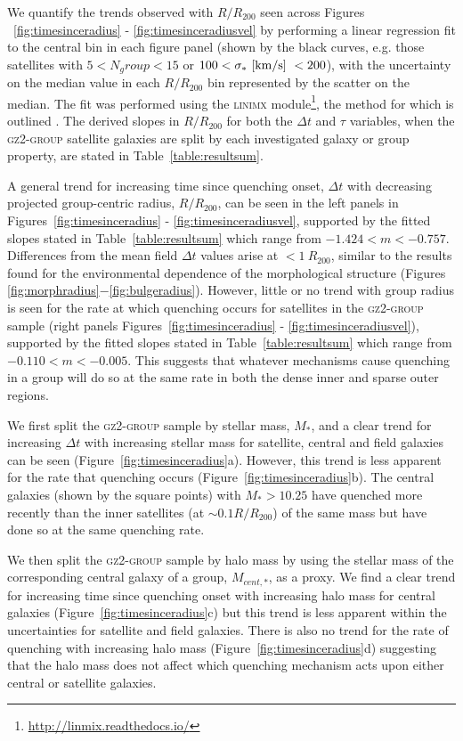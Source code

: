 \documentclass[useAMS,usenatbib]{mn2e}
\begin{document}
We quantify the trends observed with $R/R_{200}$ seen across Figures ~\ref{fig:timesinceradius} - \ref{fig:timesinceradiusvel} by performing a linear regression fit to the central bin in each figure panel (shown by the black curves, e.g. those satellites with $5 < N_group < 15$ or $100 < \sigma_*~\rm{[km/s]}~< 200$), with the uncertainty on the median value in each $R/R_{200}$ bin represented by the scatter on the median. The fit was performed using the \textsc{linimx} module\footnote{\url{http://linmix.readthedocs.io/}}, the method for which is outlined \citealt{kelly07}. The derived slopes in $R/R_{200}$ for both the $\Delta t$ and $\tau$ variables, when the \textsc{gz2-group} satellite galaxies are split by each investigated galaxy or group property, are stated in Table~\ref{table:resultsum}.

A general trend for increasing time since quenching onset, $\Delta t$ with decreasing projected group-centric radius, $R/R_{200}$, can be seen in the left panels in Figures~\ref{fig:timesinceradius} - \ref{fig:timesinceradiusvel}, supported by the fitted slopes stated in Table~\ref{table:resultsum} which range from $-1.424 < m < -0.757$. Differences from the mean field $\Delta t$ values arise at $<1~R_{200}$, similar to the results found for the environmental dependence of the morphological structure (Figures \ref{fig:morphradius}$-$\ref{fig:bulgeradius}). However, little or no trend with group radius is seen for the rate at which quenching occurs for satellites in the \textsc{gz2-group} sample (right panels Figures~\ref{fig:timesinceradius} - \ref{fig:timesinceradiusvel}), supported by the fitted slopes stated in Table~\ref{table:resultsum} which range from $-0.110 < m < -0.005$. This suggests that whatever mechanisms cause quenching in a group will do so at the same rate in both the dense inner and sparse outer regions. 

We first split the \textsc{gz2-group} sample by stellar mass, $M_*$, and a clear trend for increasing $\Delta t$ with increasing stellar mass for satellite, central and field galaxies can be seen (Figure~\ref{fig:timesinceradius}a). However, this trend is less apparent for the rate that quenching occurs (Figure~\ref{fig:timesinceradius}b). The central galaxies (shown by the square points) with $M_* > 10.25$ have quenched more recently than the inner satellites (at $\sim0.1R/R_{200}$) of the same mass but have done so at the same quenching rate. 

We then split the \textsc{gz2-group} sample by halo mass by using the stellar mass of the corresponding central galaxy of a group, $M_{cent,*}$, as a proxy. We find a clear trend for increasing time since quenching onset with increasing halo mass for central galaxies (Figure~\ref{fig:timesinceradius}c) but this trend is less apparent within the uncertainties for satellite and field galaxies. There is also no trend for the rate of quenching with increasing halo mass (Figure~\ref{fig:timesinceradius}d) suggesting that the halo mass does not affect which quenching mechanism acts upon either central or satellite galaxies. 
\end{document}
